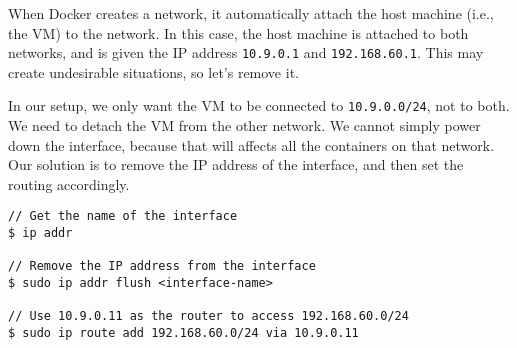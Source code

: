 
When Docker creates a network, it automatically attach the
host machine (i.e., the VM) to the network. In this
case, the host machine is attached to both
networks, and is given the IP address \texttt{10.9.0.1} and
\texttt{192.168.60.1}.
This may create undesirable situations,
so let's remove it.

In our setup, we only want the VM to be connected to
\texttt{10.9.0.0/24}, not to both.
We need to detach the VM from the other network. We cannot simply power down
the interface, because that will affects all the containers on that network.
Our solution is to remove the IP address
of the interface, and then set the routing accordingly. 


\begin{lstlisting}
// Get the name of the interface 
$ ip addr

// Remove the IP address from the interface
$ sudo ip addr flush <interface-name>

// Use 10.9.0.11 as the router to access 192.168.60.0/24
$ sudo ip route add 192.168.60.0/24 via 10.9.0.11
\end{lstlisting}

